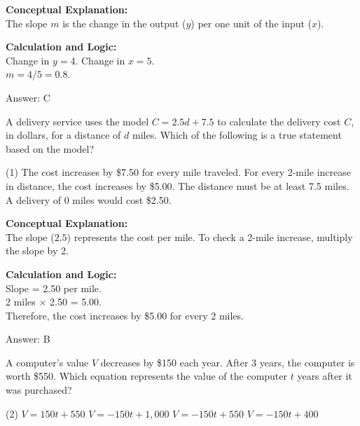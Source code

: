 \documentclass[11pt,paper=a4,answers]{exam}
\begin{document}
\begin{questions}
\begin{solution}
\textbf{Conceptual Explanation:} \\
The slope $m$ is the change in the output ($y$) per one unit of the input ($x$).

\vspace{10pt}
\textbf{Calculation and Logic:} \\
Change in $y = 4$. Change in $x = 5$. \\
$m = 4 / 5 = 0.8$.

\vspace{15pt}
Answer: \colorbox{yellow!100}{C}
\end{solution}



\question
A delivery service uses the model $C = 2.5d + 7.5$ to calculate the delivery cost $C$, in dollars, for a distance of $d$ miles. Which of the following is a true statement based on the model?
\begin{tasks}(1)
    \task The cost increases by \$7.50 for every mile traveled.
    \task For every 2-mile increase in distance, the cost increases by \$5.00.
    \task The distance must be at least 7.5 miles.
    \task A delivery of 0 miles would cost \$2.50.
\end{tasks}

\begin{solution}
\textbf{Conceptual Explanation:} \\
The slope ($2.5$) represents the cost per mile. To check a 2-mile increase, multiply the slope by 2.

\vspace{10pt}
\textbf{Calculation and Logic:} \\
Slope = 2.50 per mile. \\
2 miles $\times$ 2.50 = 5.00. \\
Therefore, the cost increases by \$5.00 for every 2 miles.

\vspace{15pt}
Answer: \colorbox{yellow!100}{B}
\end{solution}

\vspace{20pt}

\question
A computer's value $V$ decreases by \$150 each year. After 3 years, the computer is worth \$550. Which equation represents the value of the computer $t$ years after it was purchased?
\begin{tasks}(2)
    \task $V = 150t + 550$
    \task $V = -150t + 1,000$
    \task $V = -150t + 550$
    \task $V = -150t + 400$
\end{tasks}


\end{questions}
\end{document}
